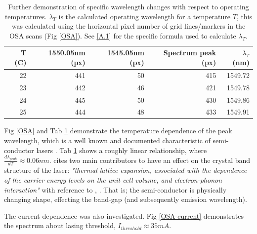 \documentclass[12pt,a4paper]{report}
\begin{document}
\begin{table}[htbp]
  \centering
  \label{tab:sample-table}
  \begin{tabular}{rrrrr}
\toprule
   \textbf{T (\degree{}C)} &   \textbf{1550.05nm (px)} &   \textbf{1545.05nm (px)} &   \textbf{Spectrum peak (px)} &   \textbf{$\lambda_T$ (nm)} \\
\midrule
                22 &                       441 &                        50 &                           415 &                     1549.72 \\
                23 &                       442 &                        46 &                           421 &                     1549.78 \\
                24 &                       445 &                        50 &                           430 &                     1549.86 \\
                25 &                       444 &                        48 &                           433 &                     1549.91 \\
\bottomrule
\end{tabular}
  \caption{Further demonstration of specific wavelength changes with respect to operating temperatures. $\lambda_T$ is the calculated operating wavelength for a temperature $T$, this was calculated using the horizontal pixel number of grid lines/markers in the OSA scans (Fig \ref{OSA}). See \ref{A.1} for the specific formula used to calculate $\lambda_T$.}
\label{OSA-t}
\end{table}

Fig \ref{OSA} and Tab \ref{OSA-t} demonstrate the temperature dependence of the peak wavelength, which is a well known and documented characteristic of semi-conductor lasers \cite{temp-dependance1}. Tab \ref{OSA-t} shows a roughly linear relationship, where $\frac{d\lambda_{peak}}{dT} \approx 0.06nm$. \cite{temp-dependance2} cites two main contributors to have an effect on the crystal band structure of the laser: \textit{"thermal lattice expansion, associated with the dependence of the carrier energy levels on the unit cell volume, and electron-phonon interaction"} with reference to \cite{temp-dependance3}, \cite{temp-dependance4}. That is; the semi-conductor is physically changing shape, effecting the band-gap (and subsequently emission wavelength).

The current dependence was also investigated. Fig \ref{OSA-current} demonstrates the spectrum about lasing threshold, $I_{threshold} \approx 35mA$.
\end{document}
